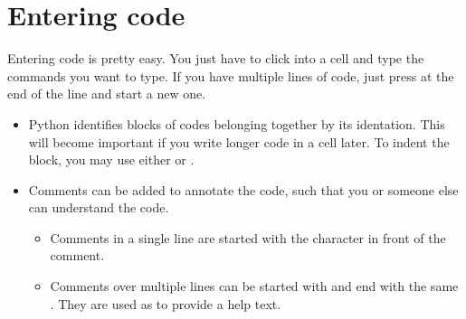 \documentclass[letterpaper,10pt,english]{sphinxmanual}
\begin{document}
\chapter{Entering code}
\label{\detokenize{notebooks/Intro/EditCells:Entering-code}}\label{\detokenize{notebooks/Intro/EditCells::doc}}
\sphinxAtStartPar
Entering code is pretty easy. You just have to click into a cell and type the commands you want to type. If you have multiple lines of code, just press  at the end of the line and start a new one.
\begin{itemize}
\item {} 
\sphinxAtStartPar
{} Python identifies blocks of codes belonging together by its identation. This will become important if you write longer code in a cell later. To indent the block, you may use either  or .

\item {} 
\sphinxAtStartPar
{} Comments can be added to annotate the code, such that you or someone else can understand the code.
\begin{itemize}
\item {} 
\sphinxAtStartPar
Comments in a single line are started with the \sphinxcode{\sphinxupquote{\#}} character in front of the comment.

\item {} 
\sphinxAtStartPar
Comments over multiple lines can be started with \sphinxcode{\sphinxupquote{\textquotesingle{}\textquotesingle{}\textquotesingle{}}}and end with the same \sphinxcode{\sphinxupquote{\textquotesingle{}\textquotesingle{}\textquotesingle{}}}. They are used as  to provide a help text.

\end{itemize}

\end{itemize}
\end{document}
